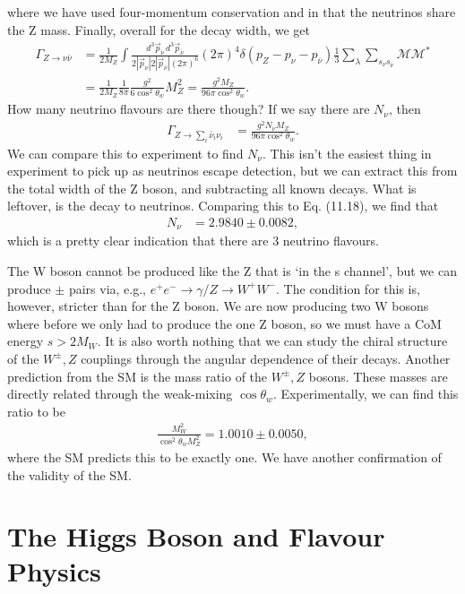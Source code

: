 \documentclass[a4paper, 11pt, normalem]{report}
\begin{document}
where we have used four-momentum conservation and in that the neutrinos share the Z mass.
Finally, overall for the decay width, we get
\begin{align}
    \Gamma_{Z\to\nu\bar{\nu}} &= \frac{1}{2M_Z}\int \frac{d^3\vec{p}_\nu\,d^3\vec{p}_{\bar{\nu}}}{2|\vec{p}_\nu|2|\vec{p}_{\bar{\nu}}|(2\pi)^6} (2\pi)^4\delta(p_Z-p_\nu-p_{\bar{\nu}})\frac13\sum_{\lambda}\sum_{s_\nu s_{\bar{\nu}}} \mathcal{M}\mathcal{M}^* \\
                              &= \frac{1}{2M_Z}\frac{1}{8\pi}\frac{g^2}{6\cos^2\theta_w}M_Z^2 = \frac{g^2 M_Z}{96\pi \cos^2\theta_w}.
\end{align}
How many neutrino flavours are there though?
If we say there are $N_\nu$, then
\begin{align}
    \Gamma_{Z\to\sum_i\bar{\nu}_i\nu_i} &= \frac{g^2 N_\nu M_Z}{96\pi\cos^2\theta_w}.
\end{align}
We can compare this to experiment to find $N_\nu$.
This isn't the easiest thing in experiment to pick up as neutrinos escape detection, but we can extract this from the total width of the Z boson, and subtracting all known decays.
What is leftover, is the decay to neutrinos.
Comparing this to Eq. (11.18), we find that
\begin{align}
    N_\nu &= 2.9840 \pm 0.0082,
\end{align}
which is a pretty clear indication that there are 3 neutrino flavours.

The W boson cannot be produced like the Z that is `in the s channel', but we can produce $\pm$ pairs via, e.g., $e^+e^-\to\gamma/Z\to W^+W^-$.
The condition for this is, however, stricter than for the Z boson.
We are now producing two W bosons where before we only had to produce the one Z boson, so we must have a CoM energy $s>2M_W$.
It is also worth nothing that we can study the chiral structure of the $W^\pm,Z$ couplings through the angular dependence of their decays.
Another prediction from the SM is the mass ratio of the $W^\pm,Z$ bosons.
These masses are directly related through the weak-mixing $\cos\theta_w$.
Experimentally, we can find this ratio to be
\begin{align}
    \frac{M_W^2}{\cos^2\theta_w M_Z^2} = 1.0010\pm0.0050,
\end{align}
where the SM predicts this to be exactly one.
We have another confirmation of the validity of the SM.

\chapter{The Higgs Boson and Flavour Physics}
\end{document}

